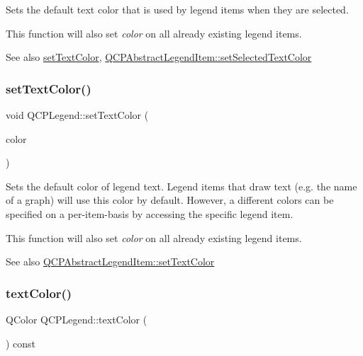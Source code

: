 Sets the default text color that is used by legend items when they are selected.

This function will also set {\itshape color} on all already existing legend items.

\begin{DoxySeeAlso}{See also}
\mbox{\hyperlink{class_q_c_p_legend_ae1eb239ff4a4632fe1b6c3e668d845c6}{set\+Text\+Color}}, \mbox{\hyperlink{class_q_c_p_abstract_legend_item_a4d01d008ee1a5bfe9905b0397a421936}{Q\+C\+P\+Abstract\+Legend\+Item\+::set\+Selected\+Text\+Color}} 
\end{DoxySeeAlso}
\mbox{\label{class_q_c_p_legend_ae1eb239ff4a4632fe1b6c3e668d845c6}} 
\subsubsection{\texorpdfstring{setTextColor()}{setTextColor()}}
{\footnotesize\ttfamily void Q\+C\+P\+Legend\+::set\+Text\+Color (\begin{DoxyParamCaption}\item[{const Q\+Color \&}]{color }\end{DoxyParamCaption})}

Sets the default color of legend text. Legend items that draw text (e.\+g. the name of a graph) will use this color by default. However, a different colors can be specified on a per-\/item-\/basis by accessing the specific legend item.

This function will also set {\itshape color} on all already existing legend items.

\begin{DoxySeeAlso}{See also}
\mbox{\hyperlink{class_q_c_p_abstract_legend_item_a6ebace6aaffaedcdab2d74e88acc2d1e}{Q\+C\+P\+Abstract\+Legend\+Item\+::set\+Text\+Color}} 
\end{DoxySeeAlso}
\mbox{\label{class_q_c_p_legend_aa96d8f1a183ec2be8c0461c0abebd6db}} 
\subsubsection{\texorpdfstring{textColor()}{textColor()}}
{\footnotesize\ttfamily Q\+Color Q\+C\+P\+Legend\+::text\+Color (\begin{DoxyParamCaption}{ }\end{DoxyParamCaption}) const\hspace{0.3cm}{\ttfamily [inline]}}



